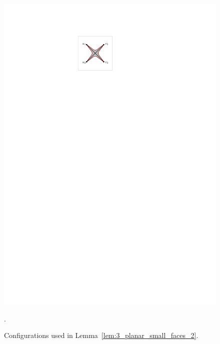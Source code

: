 \begin{figure}[htb]
\begin{minipage}[b]{.24\textwidth}
        \includegraphics[width=\textwidth,page=2]{images/3planar_one_crossing}
        \subcaption{~}\label{fig:3_planar_one_crossing_after}
    \end{minipage}
    \caption{%
    Configurations used in Lemma~\ref{lem:3_planar_small_faces_2}.}.
    \label{fig:3_planar_one_crossing_1}
\end{figure}


